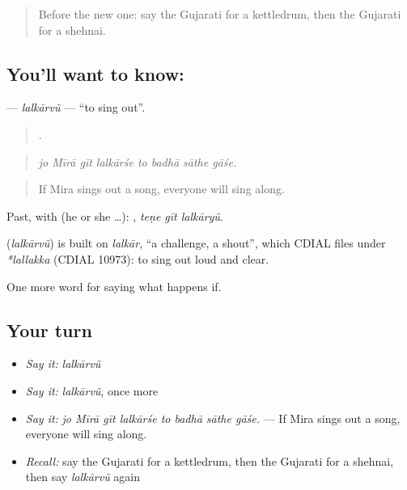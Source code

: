 \label{lesson:GU-C553-lalkarvu}



\begin{quote}
Before the new one: say the Gujarati for a kettledrum, then the Gujarati for a shehnai.
\end{quote}

\subsection*{You'll want to know: }
\textbf{} — \emph{lalkārvũ} — \textquotedblleft{}to sing out\textquotedblright{}.

\begin{quote}
       .
\end{quote}

\begin{quote}
\emph{jo Mīrā gīt lalkārśe to badhā sāthe gāśe.}
\end{quote}

\begin{quote}
If Mira sings out a song, everyone will sing along.
\end{quote}

Past, with  (he or she …):   , \emph{teṇe gīt lalkāryũ}.

\begin{cousinweb}
\textbf{} (\emph{lalkārvũ}) is built on \emph{lalkār}, \textquotedblleft{}a challenge, a shout\textquotedblright{}, which CDIAL files under \emph{*lallakka} (CDIAL 10973): to sing out loud and clear.
\end{cousinweb}

\begin{grammarlens}[title={What you've built}]
One more word for saying what happens if.
\end{grammarlens}

\subsection*{Your turn}
\begin{itemize}
\raggedright
  \item \emph{Say it:} \emph{lalkārvũ}
  \item \emph{Say it:} \emph{lalkārvũ}, once more
  \item \emph{Say it:} \emph{jo Mīrā gīt lalkārśe to badhā sāthe gāśe.} — If Mira sings out a song, everyone will sing along.
  \item \emph{Recall:} say the Gujarati for a kettledrum, then the Gujarati for a shehnai, then say \emph{lalkārvũ} again
\end{itemize}

